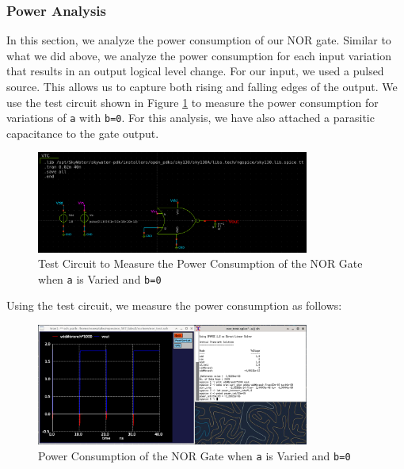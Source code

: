 \documentclass[fleqn]{article}
\begin{document}
	\subsubsection{Power Analysis}
	
	In this section, we analyze the power consumption of our NOR gate. Similar to what we did above, we analyze the power consumption for each input variation that results in an output logical level change. For our input, we used a pulsed source. This allows us to capture both rising and falling edges of the output. We use the test circuit shown in Figure \ref{fig::nor_power_test_sweep_va} to measure the power consumption for variations of \texttt{a} with \texttt{b=0}. For this analysis, we have also attached a parasitic capacitance to the gate output.
	
	\begin{figure}[H]
		\centerline{\includegraphics[width=0.8\textwidth]{nor_power_test_sweep_va.png}}
		\caption{Test Circuit to Measure the Power Consumption of the NOR Gate when \texttt{a} is Varied and \texttt{b=0}}
		\label{fig::nor_power_test_sweep_va}
	\end{figure}
	
	\noindent Using the test circuit, we measure the power consumption as follows:
	
	\begin{figure}[H]
		\centerline{\includegraphics[width=0.8\textwidth]{nor_power_sweep_va.png}}
		\caption{Power Consumption of the NOR Gate when \texttt{a} is Varied and \texttt{b=0}}
		\label{fig::nor_power_sweep_va}
	\end{figure}
	
\end{document}

